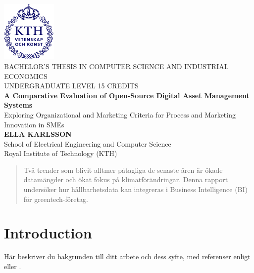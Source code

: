 \documentclass[a4paper,12pt,twocolumn]{article}
\begin{document}

\begin{titlepage}
    \centering
    \includegraphics[width=0.2\textwidth]{kthLogga.png}\\[1cm]
    {\large BACHELOR'S THESIS IN COMPUTER SCIENCE AND INDUSTRIAL ECONOMICS}\\[0.5cm]
    {\large UNDERGRADUATE LEVEL 15 CREDITS}\\[3cm]
    {\Huge \textbf{A Comparative Evaluation of Open-Source Digital Asset Management Systems}}\\[0.5cm]
    {\Large Exploring Organizational and Marketing Criteria for Process and Marketing Innovation in SMEs}\\[1cm]
    \vfill
    {\Large \textbf{ELLA KARLSSON}}\\[1cm]
    \vfill
    {\large School of Electrical Engineering and Computer Science}\\
    {\large Royal Institute of Technology (KTH)}\\
\end{titlepage}

\clearpage


\begin{abstract}
Två trender som blivit alltmer påtagliga de senaste åren är ökade datamängder och ökat fokus på klimatförändringar. Denna rapport undersöker hur hållbarhetsdata kan integreras i Business Intelligence (BI) för greentech-företag.
\end{abstract}

\tableofcontents
\newpage

\section{Introduction}
Här beskriver du bakgrunden till ditt arbete och dess syfte, med referenser enligt \citet{author2025} eller \citep{author2025}.
\end{document}
